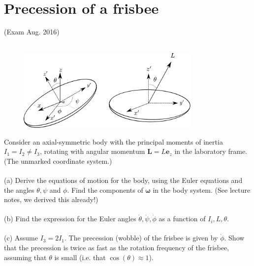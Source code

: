 \documentclass{article}
\begin{document}
    \section{Precession of a frisbee}
        (Exam Aug. 2016) \\ \\
        \begin{figure}
            \centering
            \includegraphics[width=0.8\textwidth]{figures/exercise_2_frisbee.pdf}
        \end{figure}
        Consider an axial-symmetric body with the principal moments of inertia $I_1 = I_2 \neq I_3$, rotating with angular momentum $\mathbf{L} = L \mathbf{e}_z$ in the laboratory frame. (The unmarked coordinate system.)
        \\ \\
        (a) Derive the equations of motion for the body, using the Euler equations and the angles $\theta, \psi$ and $\phi$. Find the components of $\boldsymbol{\omega}$ in the body system. (See lecture notes, we derived this already!)
        \\ \\
        (b) Find the expression for the Euler angles $\dot \theta, \dot \psi, \dot \phi$ as a function of $I_i, L, \theta$.
        \\ \\
        (c) Assume $I_3 = 2I_1$. The precession (wobble) of the frisbee is given by $\dot \phi$. Show that the precession is twice as fast as the rotation frequency of the frisbee, assuming that $\theta$ is small (i.e. that $\cos(\theta) \approx 1$).
\end{document}
